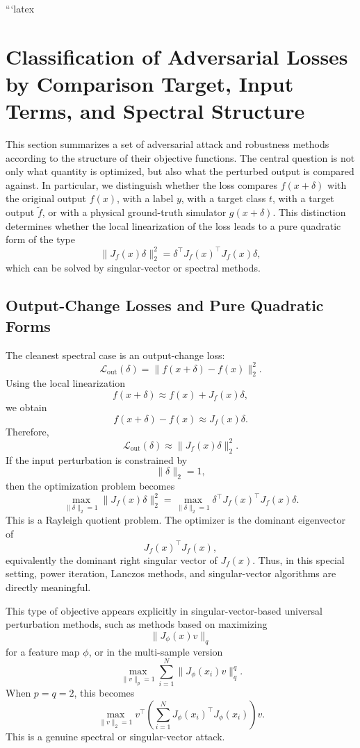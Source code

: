 \documentclass{article}
\begin{document}
```latex
\section{Classification of Adversarial Losses by Comparison Target, Input Terms, and Spectral Structure}

This section summarizes a set of adversarial attack and robustness methods according to the structure of their objective functions. The central question is not only what quantity is optimized, but also what the perturbed output is compared against. In particular, we distinguish whether the loss compares \(f(x+\delta)\) with the original output \(f(x)\), with a label \(y\), with a target class \(t\), with a target output \(\tilde f\), or with a physical ground-truth simulator \(g(x+\delta)\). This distinction determines whether the local linearization of the loss leads to a pure quadratic form of the type
\[
    \|J_f(x)\delta\|_2^2
    =
    \delta^\top J_f(x)^\top J_f(x)\delta,
\]
which can be solved by singular-vector or spectral methods.

\subsection{Output-Change Losses and Pure Quadratic Forms}

The cleanest spectral case is an output-change loss:
\[
    \mathcal{L}_{\mathrm{out}}(\delta)
    =
    \|f(x+\delta)-f(x)\|_2^2.
\]
Using the local linearization
\[
    f(x+\delta)
    \approx
    f(x)+J_f(x)\delta,
\]
we obtain
\[
    f(x+\delta)-f(x)
    \approx
    J_f(x)\delta.
\]
Therefore,
\[
    \mathcal{L}_{\mathrm{out}}(\delta)
    \approx
    \|J_f(x)\delta\|_2^2.
\]
If the input perturbation is constrained by
\[
    \|\delta\|_2=1,
\]
then the optimization problem becomes
\[
    \max_{\|\delta\|_2=1}
    \|J_f(x)\delta\|_2^2
    =
    \max_{\|\delta\|_2=1}
    \delta^\top J_f(x)^\top J_f(x)\delta.
\]
This is a Rayleigh quotient problem. The optimizer is the dominant eigenvector of
\[
    J_f(x)^\top J_f(x),
\]
equivalently the dominant right singular vector of \(J_f(x)\). Thus, in this special setting, power iteration, Lanczos methods, and singular-vector algorithms are directly meaningful.

This type of objective appears explicitly in singular-vector-based universal perturbation methods, such as methods based on maximizing
\[
    \|J_\phi(x)v\|_q
\]
for a feature map \(\phi\), or in the multi-sample version
\[
    \max_{\|v\|_p=1}
    \sum_{i=1}^N
    \|J_\phi(x_i)v\|_q^q.
\]
When \(p=q=2\), this becomes
\[
    \max_{\|v\|_2=1}
    v^\top
    \left(
        \sum_{i=1}^N
        J_\phi(x_i)^\top J_\phi(x_i)
    \right)
    v.
\]
This is a genuine spectral or singular-vector attack.
\end{document}

